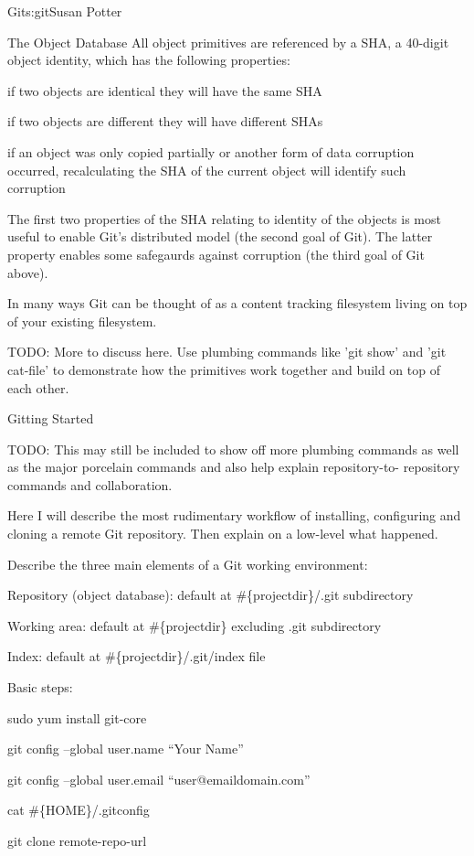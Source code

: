 \begin{aosachapter}{Git}{s:git}{Susan Potter}
\begin{aosasect1}{The Object Database}
All object primitives are referenced by a SHA, a 40-digit object identity,
which has the following properties:
\begin{aosaitemize}
  \item if two objects are identical they will have the same SHA
  \item if two objects are different they will have different SHAs
  \item if an object was only copied partially or another form of data
        corruption occurred, recalculating the SHA of the current object
        will identify such corruption
\end{aosaitemize}

The first two properties of the SHA relating to identity of the objects is
most useful to enable Git's distributed model (the second goal of Git).
The latter property enables some safegaurds against corruption (the third
goal of Git above).

In many ways Git can be thought of as a content tracking filesystem living on
top of your existing filesystem.

TODO: More to discuss here. Use plumbing commands like 'git show' and 'git
cat-file' to demonstrate how the primitives work together and build on top of
each other.

\end{aosasect1}

\begin{aosasect1}{Gitting Started}

TODO: This may still be included to show off more plumbing commands as well
as the major porcelain commands and also help explain repository-to-
repository commands and collaboration.

Here I will describe the most rudimentary workflow of installing, configuring
and cloning a remote Git repository. Then explain on a low-level what
happened.

Describe the three main elements of a Git working environment:
\begin{aosaitemize}
  \item Repository (object database): default at \#\{projectdir\}/.git
  subdirectory
  \item Working area: default at \#\{projectdir\} excluding .git subdirectory
  \item Index: default at \#\{projectdir\}/.git/index file
\end{aosaitemize}

Basic steps:
\begin{aosaitemize}
  \item sudo yum install git-core
  \item git config --global user.name ``Your Name''
  \item git config --global user.email ``user@emaildomain.com''
  \item cat \#\{HOME\}/.gitconfig
  \item git clone remote-repo-url
\end{aosaitemize}


\end{aosasect1}
\end{aosachapter}
